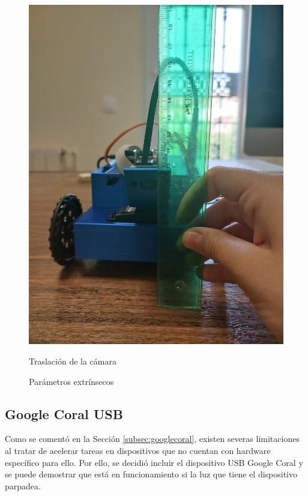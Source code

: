 \begin{figure}[ht!]
\begin{minipage}{0.35\linewidth}
		\includegraphics[width=\linewidth]{figs/cap6/traslacion.jpeg}
		\caption*{\centering Traslación de la cámara} 
	\end{minipage}
	\caption{Parámetros extrínsecos}
	\label{fig:extrinseco}
\end{figure}


\subsection{Google Coral USB}
\label{subsec:configgcoral}

Como se comentó en la Sección \ref{subsec:googlecoral}, existen severas limitaciones al tratar de acelerar tareas en dispositivos que no cuentan con hardware específico para ello. Por ello, se decidió incluir el dispositivo USB Google Coral y se puede demostrar que está en funcionamiento si la luz que tiene el dispositivo parpadea. 


